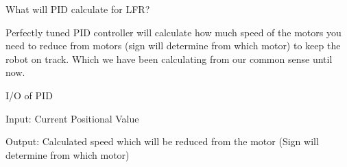 \documentclass{beamer}
\begin{document}
  
  \begin{frame}{What will PID calculate for LFR?}
  
  	Perfectly tuned PID controller will calculate how much speed of the motors you need to reduce from motors \alert{(sign will determine from which motor)} to keep the robot on track. Which we have been calculating from our common sense until now.
  	
  	\begin{alertblock}{I/O of PID}
  	
	\alert{Input: } Current Positional Value
	
	\bigskip
	
	\alert{Output: } Calculated speed which will be reduced from the motor \alert{(Sign will determine from which motor)}
  	
  	\end{alertblock}
  	
  	
  	
  
  \end{frame}
  
\end{document}
